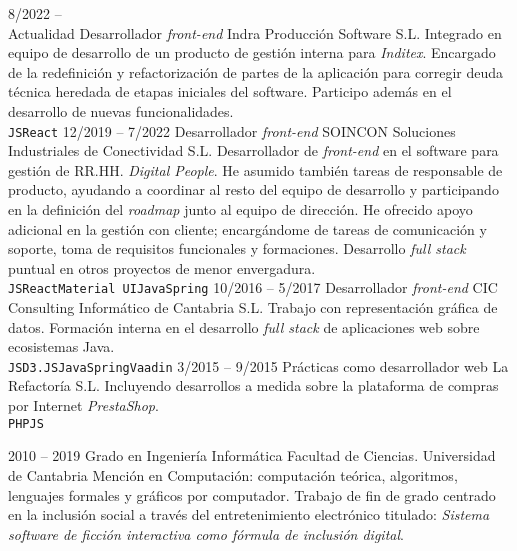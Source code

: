 \documentclass[9pt]{developercv} %
\begin{document}

%
%


\begin{entrylist}
	\entry
		{8/2022 --\\ Actualidad}
		{Desarrollador \emph{front-end}}
		{Indra Producción Software S.L.}
		{Integrado en equipo de desarrollo de un producto de gestión interna para \emph{Inditex}. Encargado de la redefinición y refactorización de partes de la aplicación para corregir deuda técnica heredada de etapas iniciales del software. Participo además en el desarrollo de nuevas funcionalidades.\\ \texttt{JS}\slashsep\texttt{React}}
	\entry
		{12/2019 -- 7/2022}
		{Desarrollador \emph{front-end}}
		{SOINCON Soluciones Industriales de Conectividad S.L.}
		{Desarrollador de \emph{front-end} en el software para gestión de RR.HH. \emph{Digital People}. He asumido también tareas de responsable de producto, ayudando a coordinar al resto del equipo de desarrollo y participando en la definición del \emph{roadmap} junto al equipo de dirección. He ofrecido apoyo adicional en la gestión con cliente; encargándome de tareas de comunicación y soporte, toma de requisitos funcionales y formaciones. Desarrollo \emph{full stack} puntual en otros proyectos de menor envergadura.\\ \texttt{JS}\slashsep\texttt{React}\slashsep\texttt{Material UI}\slashsep\texttt{Java}\slashsep\texttt{Spring}}
	\entry
		{10/2016 -- 5/2017}
		{Desarrollador \emph{front-end}}
		{CIC Consulting Informático de Cantabria S.L.}
		{Trabajo con representación gráfica de datos. Formación interna en el desarrollo \emph{full stack} de aplicaciones web sobre ecosistemas Java.\\ \texttt{JS}\slashsep\texttt{D3.JS}\slashsep\texttt{Java}\slashsep\texttt{Spring}\slashsep\texttt{Vaadin}}
	\entry
		{3/2015 -- 9/2015}
		{Prácticas como desarrollador web}
		{La Refactoría S.L.}
		{Incluyendo desarrollos a medida sobre la plataforma de compras por Internet \emph{PrestaShop}.\\ \texttt{PHP}\slashsep\texttt{JS}}
\end{entrylist}

%
%


\begin{entrylist}
	\entry
		{2010 -- 2019}
		{Grado en Ingeniería Informática}
		{Facultad de Ciencias. Universidad de Cantabria}
		{Mención en Computación: computación teórica, algoritmos, lenguajes formales y gráficos por computador. Trabajo de fin de grado centrado en la inclusión social a través del entretenimiento electrónico titulado: \emph{Sistema software de ficción interactiva como fórmula de inclusión digital}.}
\end{entrylist}
\end{document}
